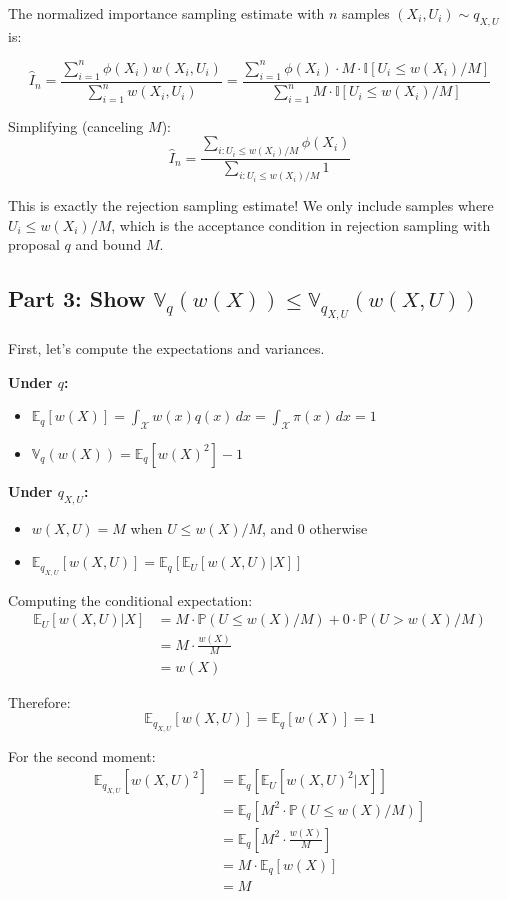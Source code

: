 The normalized importance sampling estimate with $n$ samples $(X_i, U_i) \sim q_{X,U}$ is:

\[
\hat{I}_n = \frac{\sum_{i=1}^n \phi(X_i) w(X_i, U_i)}{\sum_{i=1}^n w(X_i, U_i)} = \frac{\sum_{i=1}^n \phi(X_i) \cdot M \cdot \mathbb{I}[U_i \leq w(X_i)/M]}{\sum_{i=1}^n M \cdot \mathbb{I}[U_i \leq w(X_i)/M]}
\]

Simplifying (canceling $M$):
\[
\hat{I}_n = \frac{\sum_{i: U_i \leq w(X_i)/M} \phi(X_i)}{\sum_{i: U_i \leq w(X_i)/M} 1}
\]

This is exactly the rejection sampling estimate! We only include samples where $U_i \leq w(X_i)/M$, which is the acceptance condition in rejection sampling with proposal $q$ and bound $M$.

\subsection*{Part 3: Show $\mathbb{V}_q(w(X)) \leq \mathbb{V}_{q_{X,U}}(w(X,U))$}

First, let's compute the expectations and variances.

\textbf{Under $q$:}
\begin{itemize}
\item $\mathbb{E}_q[w(X)] = \int_{\mathcal{X}} w(x)q(x)\,dx = \int_{\mathcal{X}} \pi(x)\,dx = 1$
\item $\mathbb{V}_q(w(X)) = \mathbb{E}_q[w(X)^2] - 1$
\end{itemize}

\textbf{Under $q_{X,U}$:}
\begin{itemize}
\item $w(X,U) = M$ when $U \leq w(X)/M$, and $0$ otherwise
\item $\mathbb{E}_{q_{X,U}}[w(X,U)] = \mathbb{E}_q[\mathbb{E}_U[w(X,U)|X]]$
\end{itemize}

Computing the conditional expectation:
\begin{align*}
\mathbb{E}_U[w(X,U)|X] &= M \cdot \mathbb{P}(U \leq w(X)/M) + 0 \cdot \mathbb{P}(U > w(X)/M) \\
&= M \cdot \frac{w(X)}{M} \\
&= w(X)
\end{align*}

Therefore:
\[
\mathbb{E}_{q_{X,U}}[w(X,U)] = \mathbb{E}_q[w(X)] = 1
\]

For the second moment:
\begin{align*}
\mathbb{E}_{q_{X,U}}[w(X,U)^2] &= \mathbb{E}_q[\mathbb{E}_U[w(X,U)^2|X]] \\
&= \mathbb{E}_q[M^2 \cdot \mathbb{P}(U \leq w(X)/M)] \\
&= \mathbb{E}_q\left[M^2 \cdot \frac{w(X)}{M}\right] \\
&= M \cdot \mathbb{E}_q[w(X)] \\
&= M
\end{align*}

